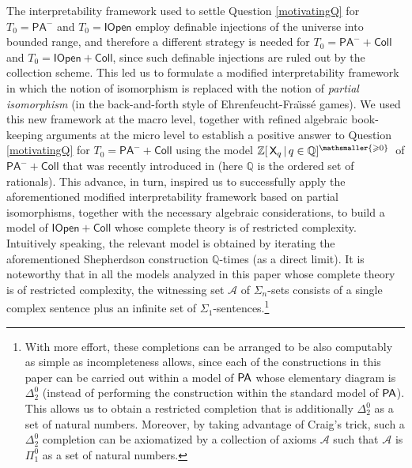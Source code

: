 \documentclass{amsart}
\renewcommand{\geq}{\geqslant}
\newcommand{\mc}[1]{\mathcal #1}
\newcommand{\pa}{{\sf PA}}
\newcommand{\X}{{\sf X}}
\newcommand{\zxxg}{\ensuremath{\mathbb Z[\,\X_q\mathop\mid q \in \mathbb{Q}]^{\mathsmaller{\geq 0}}}}
\newcommand{\skippy}{}
\begin{document}
\skippy
The interpretability framework used to settle Question \ref{motivatingQ} for $T_{0}=\mathsf{PA}^{-}$ and $T_{0}=\mathsf{IOpen}$ employ definable injections of the universe into bounded range, and therefore a different strategy is needed for $T_{0}=\mathsf{PA}^-+\mathsf{Coll}$ and $T_{0}=\mathsf{IOpen}+\mathsf{Coll}$, since such definable injections are ruled out by the collection scheme. This led us to formulate a modified interpretability framework in which the notion of isomorphism is replaced with the notion of \emph{partial isomorphism} (in the back-and-forth style of Ehrenfeucht-Fra\"{\i}ss\'{e}
games). We used this new framework at the macro level, together with refined algebraic book-keeping arguments at the micro level to establish a positive answer to Question \ref{motivatingQ}  for $T_{0}=\mathsf{PA}^{-}+\mathsf{Coll}$ using the model \zxxg\ of $\mathsf{PA}^{-}+\mathsf{Coll}$ that was recently introduced in 
\cite{enlel:cat24} (here $\mathbb{Q}$ is the ordered set of rationals). This advance, in turn, inspired us to successfully apply the aforementioned modified interpretability framework based on partial isomorphisms, together with the necessary algebraic considerations, to build a model of $\mathsf{IOpen}+\mathsf{Coll}$ whose complete theory is of restricted complexity. Intuitively speaking, the relevant model is obtained by iterating the aforementioned Shepherdson construction $\mathbb{Q}$-times (as a direct limit). It is noteworthy that in all the models analyzed in this paper whose complete theory is of restricted complexity, the witnessing set $\mc{A}$ of $\Sigma_n$-sets consists of a single complex sentence plus an infinite set of $\Sigma_1$-sentences.\footnote{With more effort, these completions can be arranged to be also computably as simple as incompleteness allows, since each of the constructions in this paper can be carried out within a model of $\pa$ whose elementary diagram is $\Delta^0_2$ (instead of performing the construction within the standard model of $\pa$). This allows us to obtain a restricted completion that is additionally $\Delta^0_2$ as a set of natural numbers. Moreover, by taking advantage of Craig's trick, such a $\Delta^0_2$ completion can be axiomatized by a collection of axioms $\mathcal{A}$ such that $\mathcal{A}$ is $\Pi^0_1$ as a set of natural numbers.}
\skippy
\end{document}
